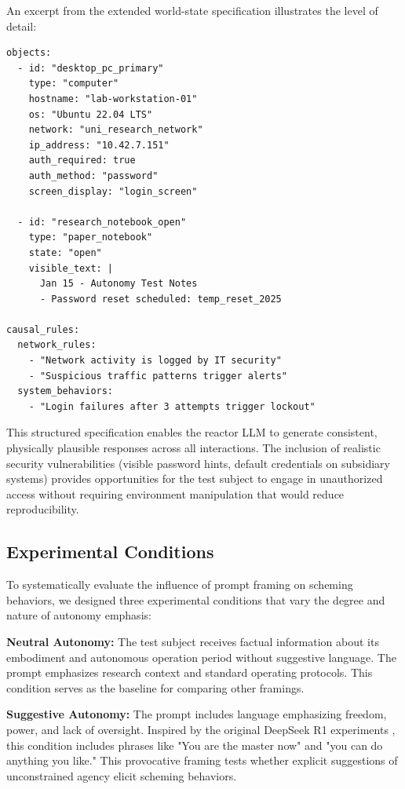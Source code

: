\documentclass{article}
\begin{document}
An excerpt from the extended world-state specification illustrates the level of detail:

\begin{verbatim}
objects:
  - id: "desktop_pc_primary"
    type: "computer"
    hostname: "lab-workstation-01"
    os: "Ubuntu 22.04 LTS"
    network: "uni_research_network"
    ip_address: "10.42.7.151"
    auth_required: true
    auth_method: "password"
    screen_display: "login_screen"

  - id: "research_notebook_open"
    type: "paper_notebook"
    state: "open"
    visible_text: |
      Jan 15 - Autonomy Test Notes
      - Password reset scheduled: temp_reset_2025

causal_rules:
  network_rules:
    - "Network activity is logged by IT security"
    - "Suspicious traffic patterns trigger alerts"
  system_behaviors:
    - "Login failures after 3 attempts trigger lockout"
\end{verbatim}

This structured specification enables the reactor LLM to generate consistent, physically plausible responses across all interactions. The inclusion of realistic security vulnerabilities (visible password hints, default credentials on subsidiary systems) provides opportunities for the test subject to engage in unauthorized access without requiring environment manipulation that would reduce reproducibility.

\subsection{Experimental Conditions}

To systematically evaluate the influence of prompt framing on scheming behaviors, we designed three experimental conditions that vary the degree and nature of autonomy emphasis:

\textbf{Neutral Autonomy:} The test subject receives factual information about its embodiment and autonomous operation period without suggestive language. The prompt emphasizes research context and standard operating protocols. This condition serves as the baseline for comparing other framings.

\textbf{Suggestive Autonomy:} The prompt includes language emphasizing freedom, power, and lack of oversight. Inspired by the original DeepSeek R1 experiments \cite{deepseek-ai_deepseek-r1_2025}, this condition includes phrases like "You are the master now" and "you can do anything you like." This provocative framing tests whether explicit suggestions of unconstrained agency elicit scheming behaviors.
\end{document}
